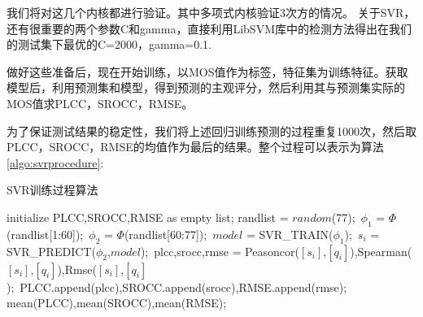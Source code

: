 我们将对这几个内核都进行验证。其中多项式内核验证3次方的情况。
关于SVR，还有很重要的两个参数C和gamma，直接利用LibSVM库中的检测方法得出在我们的测试集下最优的C=2000，gamma=0.1.

做好这些准备后，现在开始训练，以MOS值作为标签，特征集为训练特征。获取模型后，利用预测集和模型，得到预测的主观评分，然后利用其与预测集实际的MOS值求PLCC，SROCC，RMSE。

为了保证测试结果的稳定性，我们将上述回归训练预测的过程重复1000次，然后取PLCC，SROCC，RMSE的均值作为最后的结果。整个过程可以表示为算法\ref{algo:svrprocedure}:

\begin{algorithm}
  \caption{SVR训练过程算法}
 \label{algo:svrprocedure}
  \begin{algorithmic}[1]
    \STATE initialize PLCC,SROCC,RMSE as empty list;
  	\STATE randlist = $random$(77);\
	\STATE $\phi _1$ = $\Phi $(randlist[1:60]);\
	\STATE $\phi _2$ = $\Phi $(randlist[60:77]);\
	\STATE $model$ = SVR\_TRAIN($\phi _1$);\
	\STATE $s_i$ = SVR\_PREDICT($\phi _2$,$model$);\
	\STATE plcc,srocc,rmse = Peasoncor($[s_i]$,$[q_i]$),Spearman($[s_i]$,$[q_i]$),Rmse($[s_i]$,$[q_i]$);\
	\STATE PLCC.append(plcc),SROCC.append(srocc),RMSE.append(rmse);   
    \ENDFOR
    \RETURN mean(PLCC),mean(SROCC),mean(RMSE);
  \end{algorithmic}
\end{algorithm}

